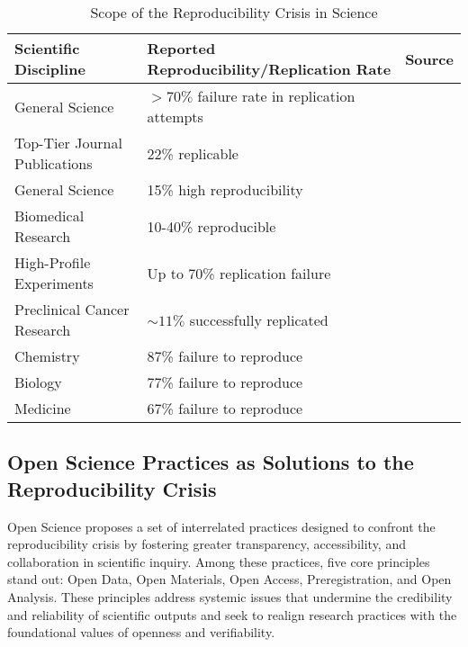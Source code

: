 \begin{table}[h]
    \centering
    \caption{Scope of the Reproducibility Crisis in Science}
    \label{tab:reproducibility_scope}
    \begin{tabular}{|p{5cm}|p{4cm}|p{4cm}|}
        \hline
        \textbf{Scientific Discipline} & \textbf{Reported Reproducibility/Replication Rate} & \textbf{Source}                 \\
        \hline
        General Science                & $>70\%$ failure rate in replication attempts       & \cite{baker2016reproducibility} \\
        Top-Tier Journal Publications  & 22\% replicable                                    & \cite{prinz2011believe}         \\
        General Science                & 15\% high reproducibility                          & \cite{baker2016reproducibility} \\
        Biomedical Research            & 10-40\% reproducible                               & \cite{freedman2015economics}    \\
        High-Profile Experiments       & Up to 70\% replication failure                     & \cite{baker2016reproducibility} \\
        Preclinical Cancer Research    & $\sim11\%$ successfully replicated                 & \cite{prinz2011believe}         \\
        Chemistry                      & 87\% failure to reproduce                          & \cite{baker2016reproducibility} \\
        Biology                        & 77\% failure to reproduce                          & \cite{baker2016reproducibility} \\
        Medicine                       & 67\% failure to reproduce                          & \cite{baker2016reproducibility} \\
        \hline
    \end{tabular}
\end{table}


\subsection{Open Science Practices as Solutions to the Reproducibility Crisis}

Open Science proposes a set of interrelated practices designed to confront the reproducibility crisis by fostering greater transparency, accessibility, and collaboration in scientific inquiry. Among these practices, five core principles stand out: Open Data, Open Materials, Open Access, Preregistration, and Open Analysis. These principles address systemic issues that undermine the credibility and reliability of scientific outputs and seek to realign research practices with the foundational values of openness and verifiability.

